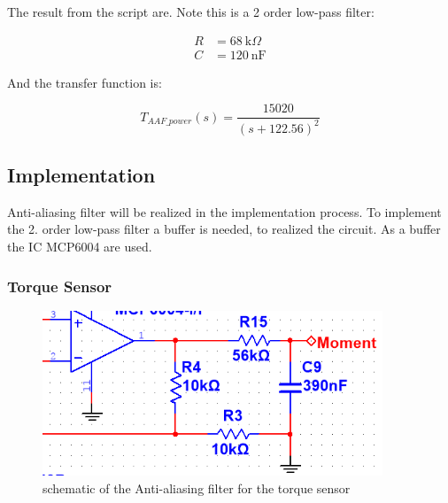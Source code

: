The result from the script are. Note this is a 2 order low-pass filter:
	
\begin{equation}
	\begin{split}
	R &= \SI{68}{\kilo\Omega}\\
	C &= \SI{120}{\nano\F}
	\end{split}
\end{equation}
	
And the transfer function is: 
	
\begin{equation}
	T_{{AAF\_power}}(s) = \frac{15020}{{(s + 122.56)}^{2}}
\end{equation}
	

\subsection{Implementation}

Anti-aliasing filter will be realized in the implementation process. To implement the 2. order low-pass filter a buffer is needed, to realized the circuit. As a buffer the IC MCP6004 are used.
	
\subsubsection*{Torque Sensor}
	
\begin{figure}[H]
	\centering
	\includegraphics [width=4in]{Hardware/Pictures/AAF_moment.PNG}
	\caption{schematic of the Anti-aliasing filter for the torque sensor}
	\label{fig:schematic_AAF_Torque}
\end{figure}
	
